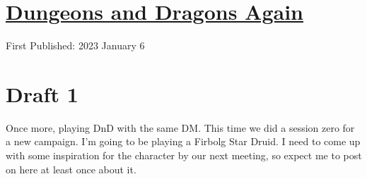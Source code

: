 \documentclass[12pt]{article}[titlepage]
\renewcommand{\,}{\textsuperscript{,}}
\begin{document}
\doublespacing
\section{\href{dungeons-dragons-4.html}{Dungeons and Dragons Again}}
First Published: 2023 January 6

\section{Draft 1}
Once more, playing DnD with the same DM.
This time we did a session zero for a new campaign.
I'm going to be playing a Firbolg Star Druid.
I need to come up with some inspiration for the character by our next meeting, so expect me to post on here at least once about it.
\end{document}
